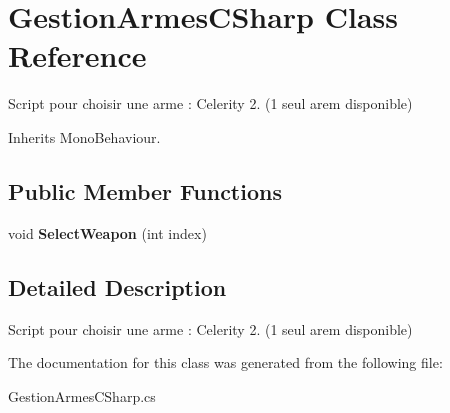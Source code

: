 \hypertarget{class_gestion_armes_c_sharp}{\section{Gestion\+Armes\+C\+Sharp Class Reference}
\label{class_gestion_armes_c_sharp}
}


Script pour choisir une arme \+: Celerity 2. (1 seul arem disponible)  




Inherits Mono\+Behaviour.

\subsection*{Public Member Functions}
\begin{DoxyCompactItemize}
\item 
\hypertarget{class_gestion_armes_c_sharp_aa186b748b994df25dc60db14c863e765}{void {\bfseries Select\+Weapon} (int index)}\label{class_gestion_armes_c_sharp_aa186b748b994df25dc60db14c863e765}

\end{DoxyCompactItemize}


\subsection{Detailed Description}
Script pour choisir une arme \+: Celerity 2. (1 seul arem disponible) 



The documentation for this class was generated from the following file\+:\begin{DoxyCompactItemize}
\item 
Gestion\+Armes\+C\+Sharp.\+cs\end{DoxyCompactItemize}
